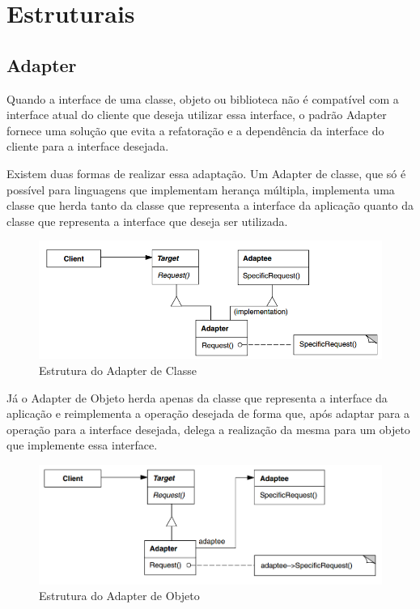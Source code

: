 \section{Estruturais}

\subsection{Adapter}

Quando a interface de uma classe, objeto ou biblioteca não 
é compatível com a interface atual do cliente que deseja 
utilizar essa interface, o padrão Adapter fornece uma 
solução que evita a refatoração e a dependência da interface 
do cliente para a interface desejada.

Existem duas formas de realizar essa adaptação. Um Adapter 
de classe, que só é possível para linguagens que implementam 
herança múltipla, implementa uma classe que herda tanto da 
classe que representa a interface da aplicação quanto da 
classe que representa a interface que deseja ser utilizada. 

\begin{figure}[htb]
	\caption{\label{fig_grafico}Estrutura do Adapter de Classe}
	\begin{center}
	    \includegraphics[scale=0.5]{5_padroes-contexto-funcional/5.2_estruturais/5.2.1_adapter/diagram2.png}
	\end{center}
\end{figure}

Já o Adapter de Objeto herda apenas da classe que representa 
a interface da aplicação e reimplementa a operação desejada 
de forma que, após adaptar para a operação para a interface 
desejada, delega a realização da mesma para um objeto que 
implemente essa interface.

\begin{figure}[htb]
	\caption{\label{fig_grafico}Estrutura do Adapter de Objeto}
	\begin{center}
	    \includegraphics[scale=0.5]{5_padroes-contexto-funcional/5.2_estruturais/5.2.1_adapter/diagram.png}
	\end{center}
\end{figure}

